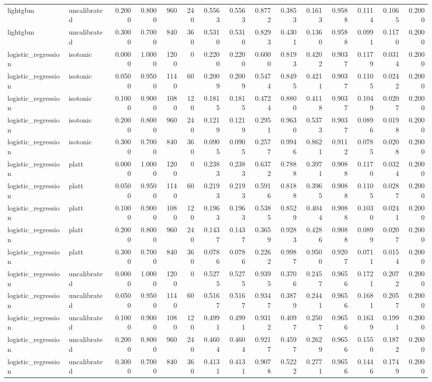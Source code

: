\begin{table}[htbp]
\begin{tabular}{llrrrrrrrrrrrrr}
lightgbm & uncalibrated & 0.2000 & 0.8000 & 960 & 240 & 0.5563 & 0.5563 & 0.8772 & 0.3853 & 0.1613 & 0.9588 & 0.1114 & 0.1065 & 0.2000 \\
lightgbm & uncalibrated & 0.3000 & 0.7000 & 840 & 360 & 0.5310 & 0.5310 & 0.8293 & 0.4301 & 0.1360 & 0.9588 & 0.0991 & 0.1170 & 0.2000 \\
logistic\_regression & isotonic & 0.0000 & 1.0000 & 1200 & 0 & 0.2200 & 0.2200 & 0.6000 & 0.8193 & 0.4202 & 0.9037 & 0.1179 & 0.0314 & 0.2000 \\
logistic\_regression & isotonic & 0.0500 & 0.9500 & 1140 & 60 & 0.2009 & 0.2009 & 0.5474 & 0.8495 & 0.4211 & 0.9037 & 0.1105 & 0.0242 & 0.2000 \\
logistic\_regression & isotonic & 0.1000 & 0.9000 & 1080 & 120 & 0.1815 & 0.1815 & 0.4724 & 0.8800 & 0.4118 & 0.9037 & 0.1049 & 0.0207 & 0.2000 \\
logistic\_regression & isotonic & 0.2000 & 0.8000 & 960 & 240 & 0.1219 & 0.1219 & 0.2951 & 0.9630 & 0.5373 & 0.9037 & 0.0896 & 0.0198 & 0.2000 \\
logistic\_regression & isotonic & 0.3000 & 0.7000 & 840 & 360 & 0.0905 & 0.0905 & 0.2577 & 0.9946 & 0.8621 & 0.9112 & 0.0785 & 0.0208 & 0.2000 \\
logistic\_regression & platt & 0.0000 & 1.0000 & 1200 & 0 & 0.2383 & 0.2383 & 0.6372 & 0.7888 & 0.3971 & 0.9088 & 0.1170 & 0.0324 & 0.2000 \\
logistic\_regression & platt & 0.0500 & 0.9500 & 1140 & 60 & 0.2193 & 0.2193 & 0.5916 & 0.8188 & 0.3965 & 0.9088 & 0.1105 & 0.0287 & 0.2000 \\
logistic\_regression & platt & 0.1000 & 0.9000 & 1080 & 120 & 0.1963 & 0.1963 & 0.5385 & 0.8529 & 0.4044 & 0.9088 & 0.1030 & 0.0241 & 0.2000 \\
logistic\_regression & platt & 0.2000 & 0.8000 & 960 & 240 & 0.1437 & 0.1437 & 0.3659 & 0.9283 & 0.4286 & 0.9088 & 0.0899 & 0.0207 & 0.2000 \\
logistic\_regression & platt & 0.3000 & 0.7000 & 840 & 360 & 0.0786 & 0.0786 & 0.2262 & 0.9987 & 0.9500 & 0.9207 & 0.0711 & 0.0154 & 0.2000 \\
logistic\_regression & uncalibrated & 0.0000 & 1.0000 & 1200 & 0 & 0.5275 & 0.5275 & 0.9395 & 0.3706 & 0.2457 & 0.9656 & 0.1721 & 0.2072 & 0.2000 \\
logistic\_regression & uncalibrated & 0.0500 & 0.9500 & 1140 & 60 & 0.5167 & 0.5167 & 0.9347 & 0.3879 & 0.2441 & 0.9656 & 0.1681 & 0.2057 & 0.2000 \\
logistic\_regression & uncalibrated & 0.1000 & 0.9000 & 1080 & 120 & 0.4991 & 0.4991 & 0.9312 & 0.4097 & 0.2507 & 0.9656 & 0.1639 & 0.1991 & 0.2000 \\
logistic\_regression & uncalibrated & 0.2000 & 0.8000 & 960 & 240 & 0.4604 & 0.4604 & 0.9217 & 0.4597 & 0.2629 & 0.9656 & 0.1550 & 0.1872 & 0.2000 \\
logistic\_regression & uncalibrated & 0.3000 & 0.7000 & 840 & 360 & 0.4131 & 0.4131 & 0.9078 & 0.5222 & 0.2771 & 0.9656 & 0.1446 & 0.1749 & 0.2000 \\
\bottomrule
\end{tabular}


\end{table}
